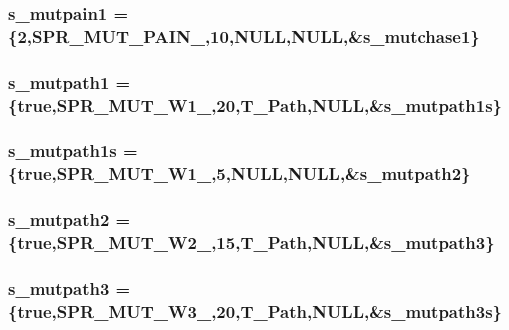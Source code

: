 \label{WL__ACT2_8C_a9a4fddc816b63dd2533cb20ce08a0b6b}
\hypertarget{WL__ACT2_8C_a9a4a31d3bf21ecf2c5a7f5c9b5c6f5d2}{
\subsubsection[{s\_\-mutpain1}]{ {\bf s\_\-mutpain1} = \{2,SPR\_\-MUT\_\-PAIN\_,10,NULL,NULL,\&{\bf s\_\-mutchase1}\}}}
\label{WL__ACT2_8C_a9a4a31d3bf21ecf2c5a7f5c9b5c6f5d2}
\hypertarget{WL__ACT2_8C_ab650793c2a14497fdd52c90a54914ee0}{
\subsubsection[{s\_\-mutpath1}]{ {\bf s\_\-mutpath1} = \{true,SPR\_\-MUT\_\-W1\_,20,T\_\-Path,NULL,\&{\bf s\_\-mutpath1s}\}}}
\label{WL__ACT2_8C_ab650793c2a14497fdd52c90a54914ee0}
\hypertarget{WL__ACT2_8C_acec161e60cabb60fce7ca7bb19cb6fb9}{
\subsubsection[{s\_\-mutpath1s}]{ {\bf s\_\-mutpath1s} = \{true,SPR\_\-MUT\_\-W1\_,5,NULL,NULL,\&{\bf s\_\-mutpath2}\}}}
\label{WL__ACT2_8C_acec161e60cabb60fce7ca7bb19cb6fb9}
\hypertarget{WL__ACT2_8C_af610cb2b216ab203c797b7230502fb2e}{
\subsubsection[{s\_\-mutpath2}]{ {\bf s\_\-mutpath2} = \{true,SPR\_\-MUT\_\-W2\_,15,T\_\-Path,NULL,\&{\bf s\_\-mutpath3}\}}}
\label{WL__ACT2_8C_af610cb2b216ab203c797b7230502fb2e}
\hypertarget{WL__ACT2_8C_aeeaa2d6e4b0038b7a5a1b87bc4bb59da}{
\subsubsection[{s\_\-mutpath3}]{ {\bf s\_\-mutpath3} = \{true,SPR\_\-MUT\_\-W3\_,20,T\_\-Path,NULL,\&{\bf s\_\-mutpath3s}\}}}
